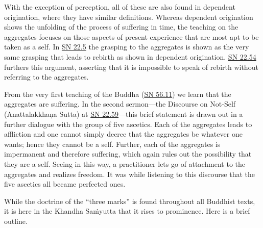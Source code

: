 \documentclass[12pt,openany]{book}%
\begin{document}
With the exception of perception, all of these are also found in dependent origination, where they have similar definitions. Whereas dependent origination shows the unfolding of the process of suffering in time, the teaching on the aggregates focuses on those aspects of present experience that are most apt to be taken as a self. In \href{https://suttacentral.net/sn22.5}{SN 22.5} the grasping to the aggregates is shown as the very same grasping that leads to rebirth as shown in dependent origination. \href{https://suttacentral.net/sn22.54}{SN 22.54} furthers this argument, asserting that it is impossible to speak of rebirth without referring to the aggregates.

From the very first teaching of the Buddha (\href{https://suttacentral.net/sn56.11}{SN 56.11}) we learn that the aggregates are suffering. In the second sermon—the Discourse on Not-Self (\textsanskrit{Anattalakkhaṇa} Sutta) at \href{https://suttacentral.net/sn22.59}{SN 22.59}—this brief statement is drawn out in a further dialogue with the group of five ascetics. Each of the aggregates leads to affliction and one cannot simply decree that the aggregates be whatever one wants; hence they cannot be a self. Further, each of the aggregates is impermanent and therefore suffering, which again rules out the possibility that they are a self. Seeing in this way, a practitioner lets go of attachment to the aggregates and realizes freedom. It was while listening to this discourse that the five ascetics all became perfected ones.

While the doctrine of the “three marks” is found throughout all Buddhist texts, it is here in the Khandha \textsanskrit{Saṁyutta} that it rises to prominence. Here is a brief outline.
\end{document}
